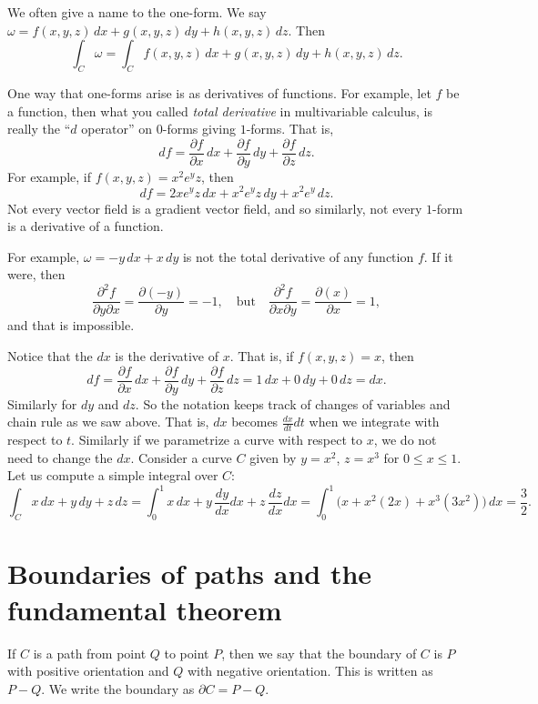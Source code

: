 \documentclass[12pt]{article}
\begin{document}
We often give a name to the one-form.  We say
$\omega = f(x,y,z) \, dx + g(x,y,z) \, dy + h(x,y,z) \, dz$.
Then
$$
\int_C \omega = 
\int_C
f(x,y,z) \, dx + 
g(x,y,z) \, dy + 
h(x,y,z) \, dz .
$$

One way that one-forms arise is as derivatives of functions.
For example, let $f$ be a function, then what you called
\emph{total derivative}
in multivariable calculus,
is really the ``$d$ operator'' on $0$-forms giving $1$-forms.  That
is,
$$
df =
\frac{\partial f}{\partial x}\, dx + 
\frac{\partial f}{\partial y}\, dy + 
\frac{\partial f}{\partial z}\, dz .
$$
For example, if $f(x,y,z) = x^2e^yz$, then
$$
df = 
2xe^y z\, dx + 
x^2e^yz\, dy + 
x^2e^y\, dz .
$$
Not every vector field is a gradient vector field, and so
similarly, not every $1$-form is a derivative of a function.

For example, $\omega = -y\, dx + x \, dy$ is not the total derivative
of any function $f$.  If it were, then
\begin{equation*}
\frac{\partial^2 f}{\partial y \partial x} = 
\frac{\partial (-y)}{\partial y} = -1,
\quad \text{but} \quad 
\frac{\partial^2 f}{\partial x \partial y} = 
\frac{\partial (x)}{\partial x} = 1,
\end{equation*}
and that is impossible.

Notice that the $dx$ is the derivative of $x$.  That is, if $f(x,y,z) = x$, then
$$
df =
\frac{\partial f}{\partial x}\, dx + 
\frac{\partial f}{\partial y}\, dy + 
\frac{\partial f}{\partial z}\, dz =
1\, dx + 
0\, dy + 
0\, dz = dx .
$$
Similarly for $dy$ and $dz$.  So the notation keeps track of changes of
variables and chain rule as we saw above.  That is, $dx$ becomes
$\frac{dx}{dt} dt$ when we integrate with respect to $t$.  Similarly if we
parametrize a curve with respect to $x$, we do not need to change the $dx$.
Consider a curve $C$
given by $y=x^2$, $z=x^3$ for $0 \leq x \leq 1$.  Let us compute a
simple integral over $C$:
\begin{equation*}
\int_C x \, dx + y \, dy + z \, dz
=
\int_0^1 x \, dx + y \, \frac{dy}{dx} dx + z \, \frac{dz}{dx} dx
=
\int_0^1 \bigl( x + x^2 (2x) + x^3 (3x^2) \bigr) \, dx
=
\frac{3}{2} .
\end{equation*}

\section*{Boundaries of paths and the fundamental theorem}

If $C$ is a path from point $Q$ to point $P$, then we say that the boundary
of $C$ is $P$ with positive orientation and $Q$ with negative orientation.
This is written as $P-Q$.  We write the boundary as $\partial C = P-Q$.
\end{document}

